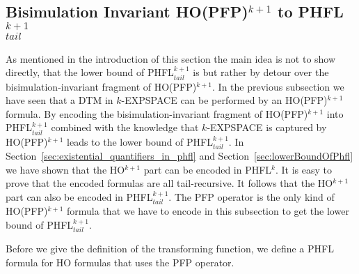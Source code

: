 \subsection{Bisimulation Invariant HO(PFP)$^{k+1}$ to PHFL$^{k+1}_{tail}$}\label{subsec:bisimulationInvariantHopfptoPhfl}

As mentioned in the introduction of this section the main idea is not to show directly, that the 
lower bound of PHFL$^{k+1}_{tail}$ is  but rather by detour over the 
bisimulation-invariant fragment of HO(PFP)$^{k+1}$. In the previous subsection we have seen 
 that a DTM in $k$-EXPSPACE can be performed by an HO(PFP)$^{k+1}$
formula. By encoding the bisimulation-invariant fragment of HO(PFP)$^{k+1}$ into
PHFL$^{k+1}_{tail}$ combined with the knowledge that $k$-EXPSPACE is captured by 
HO(PFP)$^{k+1}$ leads to the lower bound of PHFL$^{k+1}_{tail}$. In
Section~\ref{sec:existential_quantifiers_in_phfl} and Section~\ref{sec:lowerBoundOfPhfl} we 
have shown that the HO$^{k+1}$ part can be encoded in PHFL$^k$. It is easy to prove that the 
encoded formulas are all tail-recursive. It follows that the HO$^{k+1}$ part can also be 
encoded in  PHFL$^{k+1}_{tail}$. The PFP operator is the only kind of HO(PFP)$^{k+1}$ formula 
that we have to encode in this subsection to get the lower bound of PHFL$^{k+1}_{tail}$.

Before we give the definition of the transforming function, we define a PHFL formula for HO formulas that uses the PFP operator.

